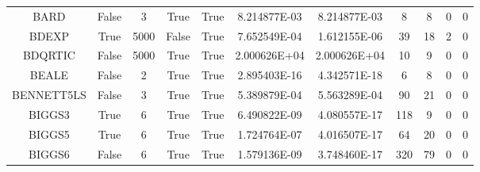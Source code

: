 \begin{longtable}{ccccccccccc}
	\cellcolor{default1} BARD& \cellcolor{default1} False& \cellcolor{default1} 3& \cellcolor{default1} True& \cellcolor{default1} True& \cellcolor{ok} 8.214877E-03& \cellcolor{best} 8.214877E-03& \cellcolor{best} 8& \cellcolor{best} 8& \cellcolor{default1} 0& \cellcolor{default1} 0\\
	\cellcolor{default2} BDEXP& \cellcolor{default2} True& \cellcolor{default2} 5000& \cellcolor{default2} False& \cellcolor{default2} True& \cellcolor{poor} 7.652549E-04& \cellcolor{best} 1.612155E-06& \cellcolor{poor} 39& \cellcolor{best} 18& \cellcolor{default2} 2& \cellcolor{default2} 0\\
	\cellcolor{default1} BDQRTIC& \cellcolor{default1} False& \cellcolor{default1} 5000& \cellcolor{default1} True& \cellcolor{default1} True& \cellcolor{best} 2.000626E+04& \cellcolor{ok} 2.000626E+04& \cellcolor{ok} 10& \cellcolor{best} 9& \cellcolor{default1} 0& \cellcolor{default1} 0\\
	\cellcolor{default2} BEALE& \cellcolor{default2} False& \cellcolor{default2} 2& \cellcolor{default2} True& \cellcolor{default2} True& \cellcolor{ok} 2.895403E-16& \cellcolor{best} 4.342571E-18& \cellcolor{best} 6& \cellcolor{ok} 8& \cellcolor{default2} 0& \cellcolor{default2} 0\\
	\cellcolor{default1} BENNETT5LS& \cellcolor{default1} False& \cellcolor{default1} 3& \cellcolor{default1} True& \cellcolor{default1} True& \cellcolor{best} 5.389879E-04& \cellcolor{ok} 5.563289E-04& \cellcolor{poor} 90& \cellcolor{best} 21& \cellcolor{default1} 0& \cellcolor{default1} 0\\
	\cellcolor{default2} BIGGS3& \cellcolor{default2} True& \cellcolor{default2} 6& \cellcolor{default2} True& \cellcolor{default2} True& \cellcolor{ok} 6.490822E-09& \cellcolor{best} 4.080557E-17& \cellcolor{poor} 118& \cellcolor{best} 9& \cellcolor{default2} 0& \cellcolor{default2} 0\\
	\cellcolor{default1} BIGGS5& \cellcolor{default1} True& \cellcolor{default1} 6& \cellcolor{default1} True& \cellcolor{default1} True& \cellcolor{ok} 1.724764E-07& \cellcolor{best} 4.016507E-17& \cellcolor{poor} 64& \cellcolor{best} 20& \cellcolor{default1} 0& \cellcolor{default1} 0\\
	\cellcolor{default2} BIGGS6& \cellcolor{default2} False& \cellcolor{default2} 6& \cellcolor{default2} True& \cellcolor{default2} True& \cellcolor{ok} 1.579136E-09& \cellcolor{best} 3.748460E-17& \cellcolor{poor} 320& \cellcolor{best} 79& \cellcolor{default2} 0& \cellcolor{default2} 0\\

\end{longtable}
